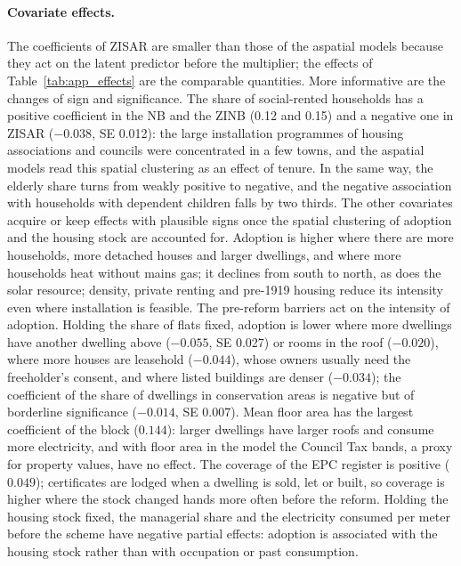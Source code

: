 \paragraph{Covariate effects.}
The coefficients of ZISAR are smaller than those of the aspatial models because they act on the latent predictor before the multiplier; the effects of Table~\ref{tab:app_effects} are the comparable quantities.
More informative are the changes of sign and significance.
The share of social-rented households has a positive coefficient in the NB and the ZINB (0.12 and 0.15) and a negative one in ZISAR ($-0.038$, SE 0.012): the large installation programmes of housing associations and councils were concentrated in a few towns, and the aspatial models read this spatial clustering as an effect of tenure.
In the same way, the elderly share turns from weakly positive to negative, and the negative association with households with dependent children falls by two thirds.
The other covariates acquire or keep effects with plausible signs once the spatial clustering of adoption and the housing stock are accounted for.
Adoption is higher where there are more households, more detached houses and larger dwellings, and where more households heat without mains gas; it declines from south to north, as does the solar resource; density, private renting and pre-1919 housing reduce its intensity even where installation is feasible.
The pre-reform barriers act on the intensity of adoption.
Holding the share of flats fixed, adoption is lower where more dwellings have another dwelling above ($-0.055$, SE 0.027) or rooms in the roof ($-0.020$), where more houses are leasehold ($-0.044$), whose owners usually need the freeholder's consent, and where listed buildings are denser ($-0.034$); the coefficient of the share of dwellings in conservation areas is negative but of borderline significance ($-0.014$, SE 0.007).
Mean floor area has the largest coefficient of the block ($0.144$): larger dwellings have larger roofs and consume more electricity, and with floor area in the model the Council Tax bands, a proxy for property values, have no effect.
The coverage of the EPC register is positive ($0.049$); certificates are lodged when a dwelling is sold, let or built, so coverage is higher where the stock changed hands more often before the reform.
Holding the housing stock fixed, the managerial share and the electricity consumed per meter before the scheme have negative partial effects: adoption is associated with the housing stock rather than with occupation or past consumption.

